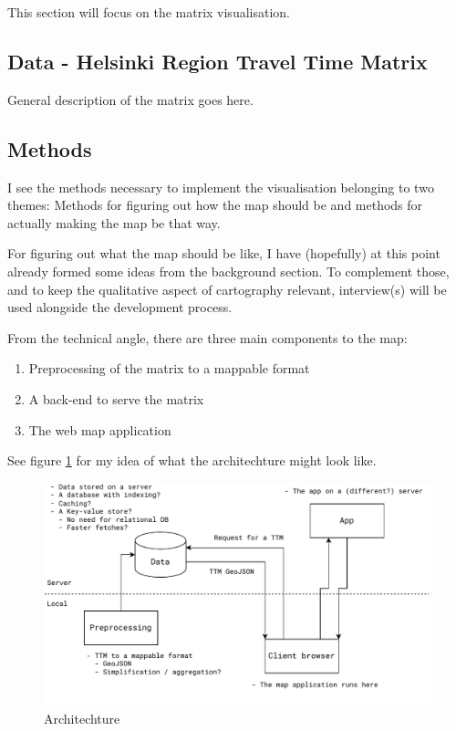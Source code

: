 \documentclass[12pt]{article}
\begin{document}
This section will focus on the matrix visualisation.

\subsection{Data - Helsinki Region Travel Time Matrix}

General description of the matrix goes here.

\subsection{Methods}

I see the methods necessary to implement the visualisation belonging to two themes:
Methods for figuring out how the map should be
and methods for actually making the map be that way.

For figuring out what the map should be like,
I have (hopefully) at this point already formed some ideas from the background section.
To complement those, and to keep the qualitative aspect of cartography relevant,
interview(s) will be used alongside the development process.

From the technical angle, there are three main components to the map:

\begin{enumerate}
	\item Preprocessing of the matrix to a mappable format
	\item A back-end to serve the matrix
	\item The web map application
\end{enumerate}

See figure \ref{fig:architechture} for my idea of what the architechture might look like.

\begin{figure}[H]
	\centering
	\includegraphics[width=1\textwidth]{images/architechture}
	\caption{Architechture}
	\label{fig:architechture}
\end{figure}
\end{document}
